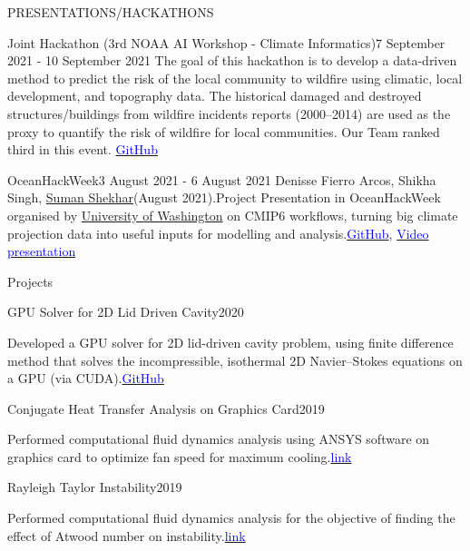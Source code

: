 \documentclass{resume} %
\begin{document}
\begin{rSection}{PRESENTATIONS/HACKATHONS}
\begin{rSubsection}{Joint Hackathon (3rd NOAA AI Workshop - Climate Informatics)}{7 September 2021 - 10 September 2021}{}
The goal of this hackathon is to develop a data-driven method to predict the risk of the local community to wildfire using climatic, local development, and topography data. The historical damaged and destroyed structures/buildings from wildfire incidents reports (2000–2014) are used as the proxy to quantify the risk of wildfire for local communities. Our Team ranked third in this event. \href{https://github.com/climate-informatics/hackathon-2021/blob/main/wildfire_risk/README.md}{\textcolor{blue}{GitHub}}
\end{rSubsection}

\begin{rSubsection}{OceanHackWeek}{3 August 2021 - 6 August 2021}{}
Denisse Fierro Arcos, Shikha Singh, \underline{Suman Shekhar}(August 2021).Project Presentation in OceanHackWeek organised by \underline{University of Washington}  on CMIP6 workflows, turning big climate projection data into useful inputs for modelling and analysis.\href{https://github.com/oceanhackweek/ohw21-proj-cmip-ard}{\textcolor{blue}{GitHub}}, \href{https://youtu.be/Y5e50p39mnQ}{\textcolor{blue}{Video presentation}}  
\end{rSubsection}

\end{rSection}
\begin{rSection}{Projects}
\begin{rSubsection}{GPU Solver for 2D Lid Driven Cavity}{2020}{}
\item Developed a GPU solver for 2D lid-driven cavity problem, using finite difference method that solves the incompressible, isothermal 2D Navier–Stokes equations on a GPU (via CUDA).\href{https://github.com/Sumanshekhar17/3rd-year-project}{\textcolor{blue}{GitHub}}
\end{rSubsection}
\begin{rSubsection}{Conjugate Heat Transfer Analysis on Graphics Card}{2019}{}
\item Performed computational fluid dynamics analysis using ANSYS software on graphics card to optimize fan speed for maximum cooling.\href{https://skill-lync.com/student-projects/conjugate-heat-transfer-analysis-on-a-graphics-card-62}{\textcolor{blue}{link}}
\end{rSubsection}

\begin{rSubsection}{Rayleigh Taylor Instability}{2019}{}
\item Performed computational fluid dynamics analysis for the objective of finding the effect of Atwood number on instability.\href{https://skill-lync.com/student-projects/rayleigh-taylor-instability-challenge-35}{\textcolor{blue}{link}}
\end{rSubsection}

\end{rSection}
\end{document}

